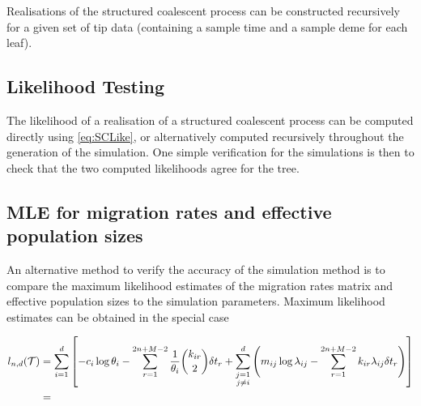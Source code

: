 Realisations of the structured coalescent process can be constructed recursively for a given set of tip data (containing a sample time and a sample deme for each leaf). 

\subsection{Likelihood Testing}
	The likelihood of a realisation of a structured coalescent process can be computed directly using \eqref{eq:SCLike}, or alternatively computed recursively throughout the generation of the simulation. One simple verification for the simulations is then to check that the two computed likelihoods agree for the tree.
	
\subsection{MLE for migration rates and effective population sizes}
	An alternative method to verify the accuracy of the simulation method is to compare the maximum likelihood estimates of the migration rates matrix and effective population sizes to the simulation parameters. Maximum likelihood estimates can be obtained in the special case 

	\begin{align*}
		l_{n,d}(\mathcal{T}) & = \sum_{i=1}^d \left[ -c_i \log \theta_i - \sum_{r=1}^{2n+M-2} \frac{1}{\theta_i} \binom{k_{ir}}{2} \delta t_r + \sum_{\substack{j=1 \\ j \neq i}}^d \left( m_{ij} \log \lambda_{ij} - \sum_{r=1}^{2n + M - 2} k_{ir} \lambda_{ij} \delta t_r \right) \right] \\
			& = 
	\end{align*}